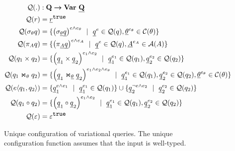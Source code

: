 \begin{figure}
\begin{alignat*}{1}
\qGroup . &: \qSet \totype \vartype \pQSet\\
%
\qGroup \vRel &= \annot [\t] \pRel\\
\qGroup {\vSel \vQ}  &=  
\setDef {\annot [\dimMeta \wedge \dimMeta_\vCond] {\left(\sigma_{\pCond} \pQ\right)} \myOR
\annot \pQ \in \qGroup \vQ, \annot [\dimMeta_\vCond] \pCond \in \cGroup}
\\
%
\qGroup {\vPrj [\vAttList] \vQ} &= 
\setDef {\annot [\dimMeta \wedge \dimMeta_\vAttList] {\left(\pi_{\pAttList} \pQ \right)} \myOR
\annot \pQ \in \qGroup \vQ, \annot [\dimMeta_\vAttList] \pAttList \in \aGroup}
\\
%
\qGroup {{\vQ_1} \times {\vQ_2}} &= 
\setDef {\annot [\dimMeta_1 \wedge \dimMeta_2] {\left(\pQ_1 \times \pQ_2\right)} \myOR
\annot [\dimMeta_1] \pQ_1 \in \qGroup {\vQ_1}, \annot [\dimMeta_2] \pQ_2 \in \qGroup {\vQ_2} }
\\
%
\qGroup {{\vQ_1} \Join_\vCond {\vQ_2}} &= 
\setDef {\annot [\dimMeta_1 \wedge \dimMeta_2 \wedge \dimMeta_\vCond] {\left(\pQ_1 \Join_{\pCond} \pQ_2 \right)} \myOR 
\annot [\dimMeta_1] \pQ_1 \in \qGroup {\vQ_1}, \annot [\dimMeta_2] \pQ_2 \in \qGroup {\vQ_2}
,\annot [\dimMeta_\vCond] \pCond \in \cGroup  }
\\
%
\qGroup {\chc {\vQ_1, \vQ_2}} &= 
\setDef {\annot [\dimMeta \wedge \dimMeta_1] \pQ_1 \myOR  \annot [\dimMeta_1] \pQ_1 \in \qGroup {\vQ_1} }
\cup 
\setDef {\annot [\neg \dimMeta \wedge \dimMeta_2] \pQ_2 \myOR  \annot [\dimMeta_2] \pQ_2 \in \qGroup {\vQ_2}}  \\
%
\qGroup {{\vQ_1} \circ {\vQ_2}} &= 
\setDef {\annot [\dimMeta_1 \wedge \dimMeta_2] {\left(\pQ_1 \circ \pQ_2\right)} \myOR
\annot [\dimMeta_1] \pQ_1 \in \qGroup {\vQ_1}, \annot [\dimMeta_2] \pQ_2 \in \qGroup {\vQ_2} }\\
%
\qGroup {\empRel} &= \annot [\t] { \empRel}
\end{alignat*}
\caption[Unique configuration of variational queries]{Unique configuration of variational queries. 
The unique configuration function assumes that the input is well-typed.
}
\label{fig:vq-group}
\end{figure}
